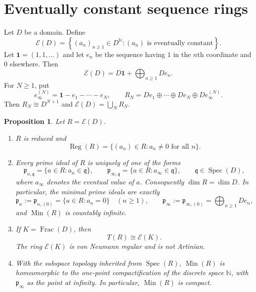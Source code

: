 \documentclass[11pt]{article}
\newtheorem{proposition}[proposition]{Proposition}
\theoremstyle{definition}
\theoremstyle{remark}
\newcommand{\Reg}{\operatorname{Reg}}
\newcommand{\Min}{\operatorname{Min}}
\newcommand{\Spec}{\operatorname{Spec}}
\newcommand{\EC}{\mathcal E}
\begin{document}
\section{Eventually constant sequence rings}\label{sec:EC}

Let $D$ be a domain.  Define
\begin{equation}\label{eq:ED}
 \EC(D)=\left\{(a_n)_{n\ge1}\in D^{\mathbb N}:
            (a_n)\text{ is eventually constant}\right\}.
\end{equation}
Let $\mathbf 1=(1,1,\ldots)$ and let $e_n$ be the sequence having $1$ in the
$n$th coordinate and $0$ elsewhere.  Then
\[
 \EC(D)=D\mathbf1+\bigoplus_{n\ge1}De_n.
\]
For $N\ge1$, put
\[
 e_\infty^{(N)}=\mathbf1-e_1-\cdots-e_N,
 \qquad
 R_N=De_1\oplus\cdots\oplus De_N\oplus De_\infty^{(N)}.
\]
Then $R_N\cong D^{N+1}$ and $\EC(D)=\bigcup_NR_N$.

\begin{proposition}\label{prop:structure}
Let $R=\EC(D)$.
\begin{enumerate}[label=\textup{(\arabic*)}]
\item $R$ is reduced and
\[
 \Reg(R)=\{(a_n)\in R:a_n\ne0\text{ for all }n\}.
\]
\item Every prime ideal of $R$ is uniquely of one of the forms
\[
 \mathfrak p_{n,\mathfrak q}
   =\{a\in R:a_n\in\mathfrak q\},
 \qquad
 \mathfrak p_{\infty,\mathfrak q}
   =\{a\in R:a_\infty\in\mathfrak q\},
 \qquad \mathfrak q\in\Spec(D),
\]
where $a_\infty$ denotes the eventual value of $a$.  Consequently
$\dim R=\dim D$.  In particular, the minimal prime ideals are exactly
\[
 \mathfrak p_n:=\mathfrak p_{n,(0)}=\{a\in R:a_n=0\}\quad(n\ge1),
 \qquad
 \mathfrak p_\infty:=\mathfrak p_{\infty,(0)}
   =\bigoplus_{n\ge1}De_n,
\]
and $\Min(R)$ is countably infinite.
\item If $K=\operatorname{Frac}(D)$, then
\[
 T(R)\cong \EC(K).
\]
The ring $\EC(K)$ is von Neumann regular and is not Artinian.
\item With the subspace topology inherited from $\Spec(R)$,
$\Min(R)$ is homeomorphic to the one-point compactification of the discrete
space $\mathbb N$, with $\mathfrak p_\infty$ as the point at infinity.  In
particular, $\Min(R)$ is compact.
\end{enumerate}
\end{proposition}
\end{document}
